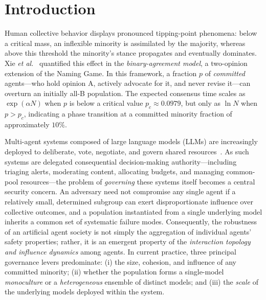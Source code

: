 \documentclass[manuscript,screen,review]{acmart}
\begin{document}



\maketitle

\section{Introduction}
Human collective behavior displays pronounced tipping-point phenomena: below a critical mass, an inflexible minority is assimilated by the majority, whereas above this threshold the minority’s stance propagates and eventually dominates. Xie \emph{et al.}~\cite{xie2011} quantified this effect in the \emph{binary-agreement model}, a two-opinion extension of the Naming Game. In this framework, a fraction $p$ of \emph{committed} agents—who hold opinion A, actively advocate for it, and never revise it—can overturn an initially all-B population. The expected consensus time scales as $\exp(\alpha N)$ when $p$ is below a critical value $p_c \approx 0.0979$, but only as $\ln N$ when $p > p_c$, indicating a phase transition at a committed minority fraction of approximately $10\%$.

Multi-agent systems composed of large language models (LLMs) are increasingly deployed to deliberate, vote, negotiate, and govern shared resources~\cite{piatti2024,ashery2025}. As such systems are delegated consequential decision-making authority—including triaging alerts, moderating content, allocating budgets, and managing common-pool resources—the problem of \emph{governing} these systems itself becomes a central security concern. An adversary need not compromise any single agent if a relatively small, determined subgroup can exert disproportionate influence over collective outcomes, and a population instantiated from a single underlying model inherits a common set of systematic failure modes. Consequently, the robustness of an artificial agent society is not simply the aggregation of individual agents’ safety properties; rather, it is an emergent property of the \emph{interaction topology and influence dynamics} among agents. In current practice, three principal governance levers predominate: (i) the size, cohesion, and influence of any committed minority; (ii) whether the population forms a single-model \emph{monoculture} or a \emph{heterogeneous} ensemble of distinct models; and (iii) the \emph{scale} of the underlying models deployed within the system.
\end{document}
